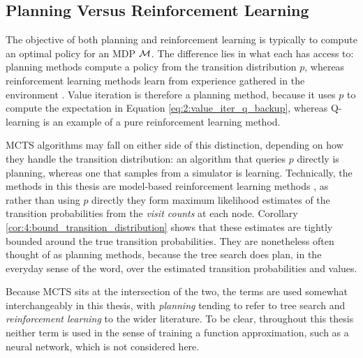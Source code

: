 \subsection{Planning Versus Reinforcement Learning}
\label{sec:2-3-2-planning_vs_rl}
    The objective of both planning and reinforcement learning is typically to compute an optimal policy for an MDP $\mathcal{M}$. The difference lies in what each has access to: planning methods compute a policy from the transition distribution $p$, whereas reinforcement learning methods learn from experience gathered in the environment \cite{sutton}. Value iteration \cite{dp,kolobov} is therefore a planning method, because it uses $p$ to compute the expectation in Equation \ref{eq:2:value_iter_q_backup}, whereas Q-learning \cite{qlearning} is an example of a pure reinforcement learning method.

    MCTS algorithms may fall on either side of this distinction, depending on how they handle the transition distribution: an algorithm that queries $p$ directly is planning, whereas one that samples from a simulator is learning. Technically, the methods in this thesis are model-based reinforcement learning methods \cite{mbrl}, as rather than using $p$ directly they form maximum likelihood estimates of the transition probabilities from the \textit{visit counts} at each node. Corollary \ref{cor:4:bound_transition_distribution} shows that these estimates are tightly bounded around the true transition probabilities. They are nonetheless often thought of as planning methods, because the tree search does plan, in the everyday sense of the word, over the estimated transition probabilities and values.

    Because MCTS sits at the intersection of the two, the terms are used somewhat interchangeably in this thesis, with \textit{planning} tending to refer to tree search and \textit{reinforcement learning} to the wider literature. To be clear, throughout this thesis neither term is used in the sense of training a function approximation, such as a neural network, which is not considered here.

        














